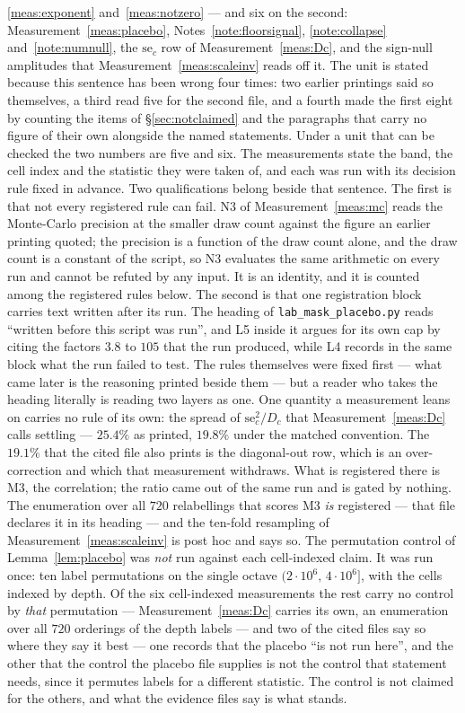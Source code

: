 \documentclass[11pt,a4paper]{article}
\theoremstyle{plain}
\theoremstyle{definition}
\theoremstyle{remark}
\begin{document}
\ref{meas:exponent} and~\ref{meas:notzero} --- and six on the second:
Measurement~\ref{meas:placebo}, Notes~\ref{note:floorsignal},
\ref{note:collapse} and~\ref{note:numnull}, the $\mathrm{se}_c$ row of
Measurement~\ref{meas:Dc}, and the sign-null amplitudes that
Measurement~\ref{meas:scaleinv} reads off it. The unit is stated because
this sentence has been wrong four times: two earlier printings said so
themselves, a third read five for the second file, and a fourth made
the first eight by counting the items of \S\ref{sec:notclaimed} and the
paragraphs that carry no figure of their own alongside the named
statements. Under a unit that can be checked the two numbers are five
and six.
The measurements state the band, the cell index and the statistic they
were taken of, and each was run with its decision rule fixed in
advance. Two qualifications belong beside that sentence.
The first is that not every registered rule can fail. N3 of
Measurement~\ref{meas:mc} reads the Monte-Carlo precision at the
smaller draw count against the figure an earlier printing quoted; the
precision is a function of the draw count alone, and the draw count is
a constant of the script, so N3 evaluates the same arithmetic on every
run and cannot be refuted by any input. It is an identity, and it is
counted among the registered rules below.
The second is that one registration block carries text written after
its run. The heading of \texttt{lab\_mask\_placebo.py} reads ``written
before this script was run'', and L5 inside it argues for its own cap
by citing the factors $3.8$ to $105$ that the run produced, while L4
records in the same block what the run failed to test. The rules
themselves were fixed first --- what came later is the reasoning
printed beside them --- but a reader who takes the heading literally
is reading two layers as one.
One quantity a measurement leans on carries no rule of its
own: the spread of $\mathrm{se}_c^2/D_c$ that
Measurement~\ref{meas:Dc} calls settling --- $25.4\%$ as printed,
$19.8\%$ under the matched convention. The $19.1\%$ that the cited
file also prints is the diagonal-out row, which is an over-correction
and which that measurement withdraws. What is registered there is
M3, the correlation; the ratio came out of the same run and is gated
by nothing. The enumeration over all $720$ relabellings that scores M3
\emph{is} registered --- that file declares it in its heading --- and
the ten-fold resampling of Measurement~\ref{meas:scaleinv} is post hoc
and says so. The permutation control of Lemma~\ref{lem:placebo} was
\emph{not} run against each cell-indexed claim. It was run once: ten
label permutations on the single octave $(2\cdot10^6,\,4\cdot10^6]$,
with the cells indexed by depth. Of the six cell-indexed measurements
the rest carry no control by \emph{that} permutation ---
Measurement~\ref{meas:Dc} carries its own, an enumeration over all
$720$ orderings of the depth labels --- and two of the cited files say
so where they say it best --- one records that the placebo ``is not
run here'', and the other that the control the placebo file supplies
is not the control that statement needs, since it permutes labels for
a different statistic. The control is not claimed for the others, and
what the evidence files say is what stands.
\end{document}
